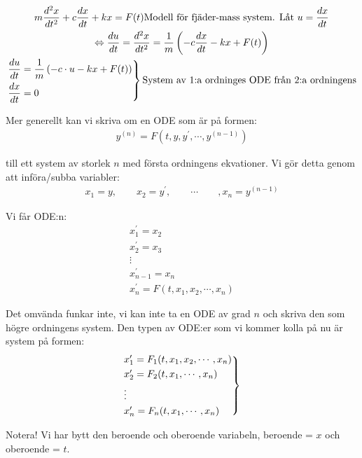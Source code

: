 \begin{equation*}
  \begin{gathered}
    m\dfrac{d^2x}{dt^2}+c\dfrac{dx}{dt}+kx = F(t)
    \text{Modell för fjäder-mass system. Låt } u = \dfrac{dx}{dt}\\
    \Lrarr \dfrac{du}{dt} = \dfrac{d^2x}{dt^2} = \dfrac{1}{m}\left(-c\dfrac{dx}{dt}-kx+F(t)\right)\\
    \begin{rcases*}
      \dfrac{du}{dt}=\dfrac{1}{m}\left(-c\cdot u-kx+F(t)\right)\\
      \dfrac{dx}{dt}=0
    \end{rcases*}\text{System av 1:a ordninges ODE från 2:a ordningens}
  \end{gathered}
\end{equation*}
\par\bigskip
\noindent Mer generellt kan vi skriva om en ODE som är på formen:
\begin{equation*}
  \begin{gathered}
    y^{(n)}=F(t,y,y^{\prime},\cdots, y^{(n-1)})
  \end{gathered}
\end{equation*}\par
\noindent till ett system av storlek $n$ med första ordningens ekvationer. Vi gör detta genom att införa/subba variabler:
\begin{equation*}
  \begin{gathered}
    x_1 = y,\qquad x_2 = y^{\prime},\qquad\cdots\qquad, x_n = y^{(n-1)}
  \end{gathered}
\end{equation*}\par
\noindent Vi får ODE:n:
\begin{equation*}
  \begin{gathered}
    x_1^{\prime}=x_2\\
    x_2^{\prime} = x_3\\
    \vdots\\
    x_{n-1}^{\prime}=x_n\\
    x_n^{\prime} = F(t,x_1, x_2,\cdots,x_n)
  \end{gathered}
\end{equation*}
\par\bigskip
\noindent Det omvända funkar inte, vi kan inte ta en ODE av grad $n$ och skriva den som högre ordningens system. Den typen av ODE:er som vi kommer kolla på nu är system på formen:
\begin{equation*}
  \begin{gathered}
    \begin{rcases*}
      x_1^{\prime} = F_1(t,x_1,x_2,\cdots,x_n)\\
      x_2^{\prime} = F_2(t,x_1,\cdots,x_n)\\
      \vdots\\
      x_n^{\prime} = F_n(t,x_1,\cdots, x_n)
    \end{rcases*}
  \end{gathered}
\end{equation*}
\par\bigskip
\noindent Notera! Vi har bytt den beroende och oberoende variabeln, beroende = $x$ och oberoende = $t$.
